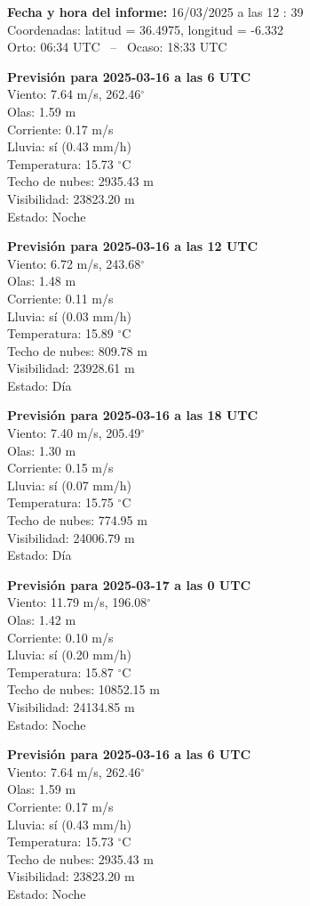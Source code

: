{\bf Fecha y hora del informe:} 16/03/2025 a las 12 : 39\\
Coordenadas: latitud = 36.4975, longitud = -6.332\\
Orto: 06:34 UTC \, -- \, Ocaso: 18:33 UTC

{\bf Previsión para 2025-03-16 a las 6 UTC}\\
  Viento: 7.64 m/s, 262.46$^\circ$\\
  Olas: 1.59 m\\
  Corriente: 0.17 m/s\\
  Lluvia: sí (0.43 mm/h)\\
  Temperatura: 15.73 $^\circ$C\\
  Techo de nubes: 2935.43 m\\
  Visibilidad: 23823.20 m\\
  Estado: Noche

{\bf Previsión para 2025-03-16 a las 12 UTC}\\
  Viento: 6.72 m/s, 243.68$^\circ$\\
  Olas: 1.48 m\\
  Corriente: 0.11 m/s\\
  Lluvia: sí (0.03 mm/h)\\
  Temperatura: 15.89 $^\circ$C\\
  Techo de nubes: 809.78 m\\
  Visibilidad: 23928.61 m\\
  Estado: Día

{\bf Previsión para 2025-03-16 a las 18 UTC}\\
  Viento: 7.40 m/s, 205.49$^\circ$\\
  Olas: 1.30 m\\
  Corriente: 0.15 m/s\\
  Lluvia: sí (0.07 mm/h)\\
  Temperatura: 15.75 $^\circ$C\\
  Techo de nubes: 774.95 m\\
  Visibilidad: 24006.79 m\\
  Estado: Día

{\bf Previsión para 2025-03-17 a las 0 UTC}\\
  Viento: 11.79 m/s, 196.08$^\circ$\\
  Olas: 1.42 m\\
  Corriente: 0.10 m/s\\
  Lluvia: sí (0.20 mm/h)\\
  Temperatura: 15.87 $^\circ$C\\
  Techo de nubes: 10852.15 m\\
  Visibilidad: 24134.85 m\\
  Estado: Noche

{\bf Previsión para 2025-03-16 a las 6 UTC}\\
  Viento: 7.64 m/s, 262.46$^\circ$\\
  Olas: 1.59 m\\
  Corriente: 0.17 m/s\\
  Lluvia: sí (0.43 mm/h)\\
  Temperatura: 15.73 $^\circ$C\\
  Techo de nubes: 2935.43 m\\
  Visibilidad: 23823.20 m\\
  Estado: Noche

